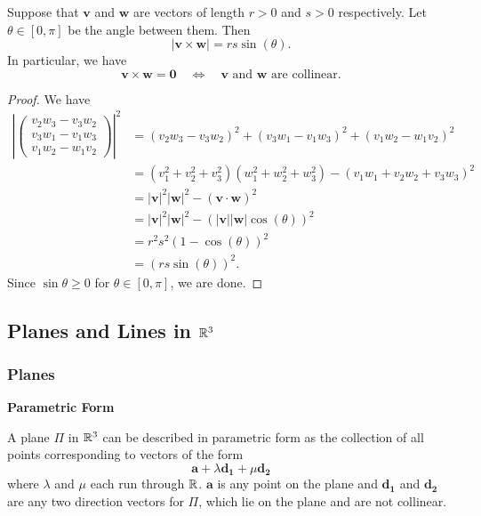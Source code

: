 \documentclass[10pt, a4paper]{article}
\newcommand{\mbf}[1]{\mathbf{#1}}
\begin{document}
\begin{lemma}
    Suppose that $\mbf{v}$ and $\mbf{w}$ are vectors of length $r > 0$ and $s > 0$ respectively. Let $\theta \in [0, \pi]$ be the angle between them. Then
    \[
    |\mbf{v \times w}| = rs\sin(\theta).
    \]
    In particular, we have
    \[
    \mbf{v \times w = 0}\quad\iff\quad\mbf{v}\text{ and }\mbf{w}\text{ are collinear}.
    \]

    \begin{proof}
        We have
        \begin{align*}
            \left|\begin{pmatrix}
                v_2 w_3 - v_3 w_2 \\
                v_3 w_1 - v_1 w_3 \\
                v_1 w_2 - w_1 v_2
            \end{pmatrix}\right| ^ 2
            &= (v_2w_3 - v_3w_2) ^ 2 + (v_3w_1 - v_1w_3) ^ 2 + (v_1w_2 - w_1v_2) ^ 2 \\
            &= (v_1 ^ 2 + v_2 ^ 2 + v_3 ^ 2)(w_1 ^ 2 + w_2 ^ 2 + w_3 ^ 2) - (v_1w_1 + v_2w_2 + v_3w_3) ^ 2 \\
            &= |\mbf{v}| ^ 2 |\mbf{w}| ^ 2 - (\mbf{v \cdot w}) ^ 2 \\
            &= |\mbf{v}| ^ 2 |\mbf{w}| ^ 2 - (|\mbf{v}||\mbf{w}|\cos(\theta)) ^ 2 \\
            &= r^2s^2(1 - \cos(\theta)) ^ 2 \\
            &= (rs\sin(\theta)) ^ 2.
        \end{align*}
        Since $\sin\theta \geq 0$ for $\theta \in [0, \pi]$, we are done.
    \end{proof}
\end{lemma}

\subsection{Planes and Lines in $\mathbb{R} ^ 3$}
\subsubsection{Planes}

\textbf{Parametric Form}

A plane $\Pi$ in $\mathbb{R} ^ 3$ can be described in parametric form as the collection of all points corresponding to vectors of the form
\[
\mbf{a} + \lambda\mbf{d_1} + \mu\mbf{d_2}
\]
where $\lambda$ and $\mu$ each run through $\mathbb{R}$. $\mbf{a}$ is any point on the plane and $\mbf{d_1}$ and $\mbf{d_2}$ are any two direction vectors for $\Pi$, which lie on the plane and are not collinear.
\end{document}
